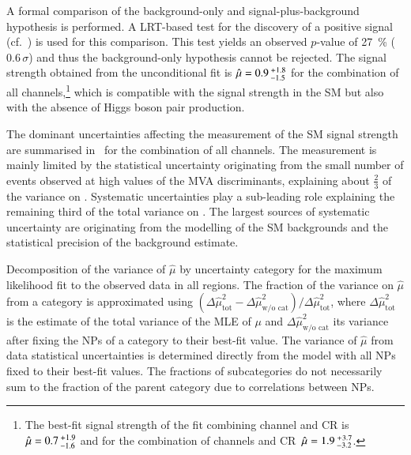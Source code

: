 A formal comparison of the background-only and signal-plus-background hypothesis
is performed. A LRT-based test for the discovery of a positive signal
(cf.~) is used for this comparison. This test yields an
observed $p$-value of \SI{27}{\percent} ($0.6\,\sigma$) and thus the
background-only hypothesis cannot be rejected.
The signal strength obtained from the unconditional fit is
$\hat{\mu} = 0.9\,^{\hspace{0.25pt}+\hspace{0.25pt}1.8}_{-1.5}$ for the
combination of all channels,\footnote{The best-fit signal strength of the fit
  combining \hadhad channel and CR
  is~$\hat{\mu} = 0.7\,^{\hspace{0.25pt}+\hspace{0.25pt}1.9}_{-1.6}$ and for the
  combination of \lephad channels and
  CR~$\hat{\mu} = 1.9\,^{\hspace{0.25pt}+\hspace{0.25pt}3.7}_{-3.2}$.} which is
compatible with the signal strength in the SM but also with the absence of Higgs
boson pair production.

The dominant uncertainties affecting the measurement of the SM \HH signal
strength are summarised in~ for the combination of
all channels. The measurement is mainly limited by the statistical uncertainty
originating from the small number of events observed at high values of the MVA
discriminants, explaining about $\frac{2}{3}$ of the variance on
\muhat. Systematic uncertainties play a sub-leading role explaining the
remaining third of the total variance on \muhat. The largest sources of
systematic uncertainty are originating from the modelling of the SM backgrounds
and the statistical precision of the background estimate.

\begin{table}[htbp]
  \centering

  \caption{Decomposition of the variance of $\hat{\mu}$ by uncertainty category
    for the maximum likelihood fit to the observed data in all regions. The
    fraction of the variance on $\hat{\mu}$ from a category is approximated
    using
    $(\Delta\hat{\mu}^2_{\text{tot}} - \Delta\hat{\mu}^2_{\text{w/o cat}}) /
    \Delta \hat{\mu}^2_{\text{tot}}$, where $\Delta\hat{\mu}^2_{\text{tot}}$ is
    the estimate of the total variance of the MLE of $\mu$ and
    $\Delta\hat{\mu}^2_{\text{w/o cat}}$ its variance after fixing the NPs of a
    category to their best-fit value. The variance of $\hat{\mu}$ from data
    statistical uncertainties is determined directly from the model with all NPs
    fixed to their best-fit values. The fractions of subcategories do not
    necessarily sum to the fraction of the parent category due to correlations
    between NPs.}

  

  \label{tab:breakdown_nonres}
\end{table}

